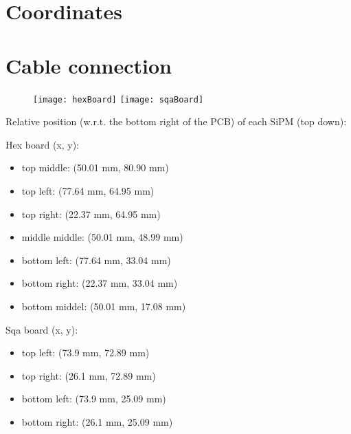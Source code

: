 \documentclass{report}
\begin{document}
\section{Coordinates}
\begin{figure}[!h]
\centering
{}
\end{figure}


\section{Cable connection}
\begin{figure}[h]
    \centering
    \texttt{[image: hexBoard]}
    \texttt{[image: sqaBoard]}
\end{figure}

Relative position (w.r.t. the bottom right of the PCB) of each SiPM (top down):

Hex board (x, y):
\begin{itemize}
    \item top middle: (50.01 mm, 80.90 mm)
    \item top left:   (77.64 mm, 64.95 mm)
    \item top right:  (22.37 mm, 64.95 mm)
    \item middle middle: (50.01 mm, 48.99 mm)
    \item bottom left: (77.64 mm, 33.04 mm)
    \item bottom right: (22.37 mm, 33.04 mm)
    \item bottom middel: (50.01 mm, 17.08 mm)
\end{itemize}

Sqa board (x, y):
\begin{itemize}
    \item top left: (73.9 mm, 72.89 mm)
    \item top right: (26.1 mm, 72.89 mm)
    \item bottom left: (73.9 mm, 25.09 mm)
    \item bottom right: (26.1 mm, 25.09 mm)
\end{itemize}
\end{document}
